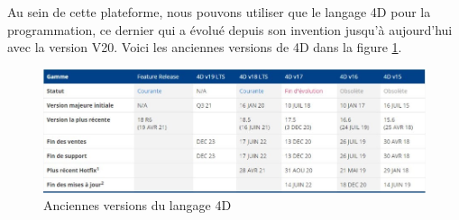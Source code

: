 Au sein de cette plateforme, nous pouvons utiliser que le langage 4D pour la programmation, 
ce dernier qui a évolué depuis son invention 
jusqu'à aujourd'hui avec la version V20.
Voici les anciennes versions de 4D dans la figure \ref{fig:versions}.
\begin{figure}[h]
    \centering
    \includegraphics[scale=0.6]{Images/versions.jpg} %
    \caption{Anciennes versions du langage 4D\cite{4d}}
    \label{fig:versions}
\end{figure}




